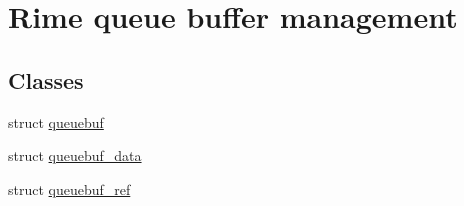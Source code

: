 \hypertarget{group__rimequeuebuf}{}\section{Rime queue buffer management}
\label{group__rimequeuebuf}
\subsection*{Classes}
\begin{DoxyCompactItemize}
\item 
struct \hyperlink{structqueuebuf}{queuebuf}
\item 
struct \hyperlink{structqueuebuf__data}{queuebuf\+\_\+data}
\item 
struct \hyperlink{structqueuebuf__ref}{queuebuf\+\_\+ref}
\end{DoxyCompactItemize}

